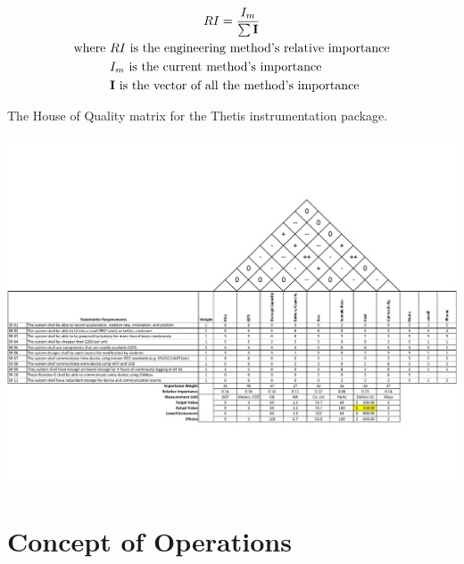 \begin{gather}
	\label{eq:hoq_rel_importance}
	RI = \frac{I_m}{\sum{\textbf{I}}} \\
	\begin{aligned}
		\text{where } &RI \text{ is the engineering method's relative importance} \\
					  &I_m \text{ is the current method's importance} \\
					  &\textbf{I} \text{ is the vector of all the method's importance} \\
	\end{aligned} \notag
\end{gather}

\begin{landscape}
	\begin{table}
		\caption[House of Quality]{The House of Quality matrix for the Thetis instrumentation package.}
		\label{tab:hoq}
		\includegraphics[height=\textwidth-24pt]{../include/ThetisHOQ.pdf}
	\end{table}
\end{landscape}

\section{Concept of Operations} \label{sec:conops}

